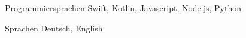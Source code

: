 

\begin{cvskills}
  \cvskill
    {Programmiersprachen} %
    {Swift, Kotlin, Javascript, Node.js, Python} %
	
  \cvskill
    {Sprachen} %
    {Deutsch, English} %
    
\end{cvskills}
